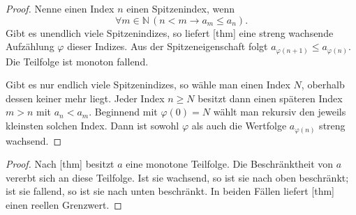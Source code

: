 \documentclass[main.tex]{subfiles}
\begin{document}
\begin{proof}
Nenne einen Index \(n\) einen Spitzenindex, wenn
\[
  \forall m\in\mathbb N\,(n<m\rightarrow a_m\leq a_n).
\]
Gibt es unendlich viele Spitzenindizes, so liefert
[thm] eine streng
wachsende Aufzählung \(\varphi\) dieser Indizes. Aus der Spitzeneigenschaft
folgt
\(a_{\varphi(n+1)}\leq a_{\varphi(n)}\). Die Teilfolge ist monoton
fallend.

Gibt es nur endlich viele Spitzenindizes, so wähle man einen Index
\(N\), oberhalb dessen keiner mehr liegt. Jeder Index \(n\geq N\) besitzt
dann einen späteren Index \(m>n\) mit \(a_n<a_m\). Beginnend mit
\(\varphi(0)=N\) wählt man rekursiv den jeweils kleinsten solchen Index.
Dann ist sowohl \(\varphi\) als auch die Wertfolge
\(a_{\varphi(n)}\) streng wachsend.
\end{proof}

\begin{proof}
Nach [thm] besitzt \(a\) eine
monotone Teilfolge. Die Beschränktheit von \(a\) vererbt sich an diese
Teilfolge. Ist sie wachsend, so ist sie nach oben beschränkt; ist sie
fallend, so ist sie nach unten beschränkt. In beiden Fällen liefert
[thm] einen reellen Grenzwert.
\end{proof}
\end{document}
